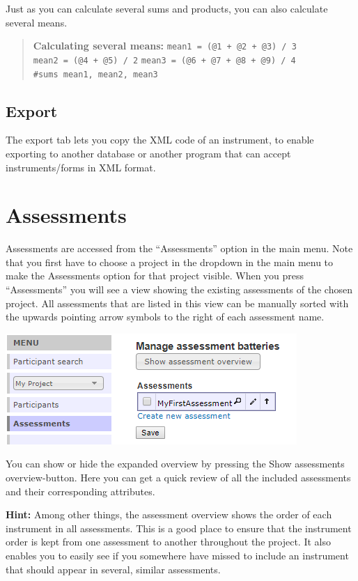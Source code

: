 \documentclass[
]{book}
\begin{document}
Just as you can calculate several sums and products, you can also calculate several means.

\begin{quote}
\textbf{Calculating several means:} \texttt{mean1\ =\ (@1\ +\ @2\ +\ @3)\ /\ 3} \texttt{mean2\ =\ (@4\ +\ @5)\ /\ 2} \texttt{mean3\ =\ (@6\ +\ @7\ +\ @8\ +\ @9)\ /\ 4} \texttt{\#sums\ mean1,\ mean2,\ mean3}
\end{quote}

\section{Export}\label{export}

The export tab lets you copy the XML code of an instrument, to enable exporting to another database or another program that can accept instruments/forms in XML format.

\chapter{Assessments}\label{assessments}

Assessments are accessed from the ``Assessments'' option in the main menu. Note that you first have to choose a project in the dropdown in the main menu to make the Assessments option for that project visible. When you press ``Assessments'' you will see a view showing the existing assessments of the chosen project. All assessments that are listed in this view can be manually sorted with the upwards pointing arrow symbols to the right of each assessment name.

\includegraphics{images/assessement.png}

You can show or hide the expanded overview by pressing the Show assessments overview-button. Here you can get a quick review of all the included assessments and their corresponding attributes.

\textbf{Hint:} Among other things, the assessment overview shows the order of each instrument in all assessments. This is a good place to ensure that the instrument order is kept from one assessment to another throughout the project. It also enables you to easily see if you somewhere have missed to include an instrument that should appear in several, similar assessments.
\end{document}
